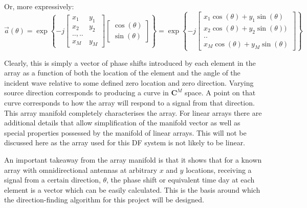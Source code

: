 Or, more expressively:
\begin{equation}
\vec{a}(\theta) = \exp \left\{ -j \begin{bmatrix} x_1 & y_1 \\ x_2 & y_2 \\ .., .. \\ x_M & y_M \end{bmatrix} \begin{bmatrix} \cos(\theta) \\ \sin(\theta) \end{bmatrix} \right\}
= \exp \left\{ -j \begin{bmatrix} x_1\cos(\theta) + y_1\sin(\theta) \\ x_2\cos(\theta) + y_2\sin(\theta)) \\ .. \\ x_M\cos(\theta) + y_M\sin(\theta) \end{bmatrix} \right\}
\end{equation}

Clearly, this is simply a vector of phase shifts introduced by each element in the array as a function of both the location of the element and the angle of the incident wave relative to some defined zero location and zero direction. 
Varying source direction corresponds to producing a curve in \(\mathbf{C}^M\) space. 
A point on that curve corresponds to how the array will respond to a signal from that direction.
This array manifold completely characterises the array\cite{dacos1995estimating}. 
For linear arrays there are additional details that allow simplification of the manifold vector as well as special properties possessed by the manifold of linear arrays.
This will not be discussed here as the array used for this DF system is not likely to be linear. 

An important takeaway from the array manifold is that it shows that for a known array with omnidirectional antennas at arbitrary \(x\) and \(y\) locations, receiving a signal from a certain direction, \(\theta\), the phase shift or equivalent time day at each element is a vector which can be easily calculated. This is the basis around which the direction-finding algorithm for this project will be designed. 
